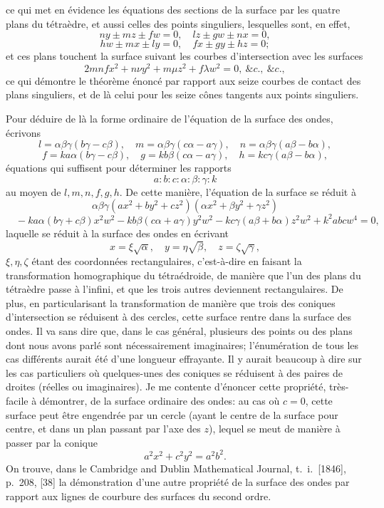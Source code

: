 \documentclass[12pt,a4paper]{article}
\begin{document}
ce qui met en \'evidence les \'equations des sections de la surface par les quatre plans du t\'etra\`edre, et aussi celles des points singuliers, lesquelles sont, en effet,
\[
ny \pm mz \pm fw = 0,\quad lz \pm gw \pm nx = 0,
\]
\[
hw \pm mx \pm ly = 0,\quad fx \pm gy \pm hz = 0;
\]
et ces plans touchent la surface suivant les courbes d'intersection avec les surfaces
\[
2mnfx^2 + n\nu y^2 + m\mu z^2 + f\lambda w^2 = 0,\ \&c.,\ \&c.,
\]
ce qui d\'emontre le th\'eor\`eme \'enonc\'e par rapport aux seize courbes de contact des plans singuliers, et de l\`a celui pour les seize c\^ones tangents aux points singuliers.

Pour d\'eduire de l\`a la forme ordinaire de l'\'equation de la surface des ondes, \'ecrivons
\[
l = \alpha\beta\gamma(b\gamma - c\beta),\quad m = \alpha\beta\gamma(c\alpha - a\gamma),\quad n = \alpha\beta\gamma(a\beta - b\alpha),
\]
\[
f = ka\alpha(b\gamma - c\beta),\quad g = kb\beta(c\alpha - a\gamma),\quad h = kc\gamma(a\beta - b\alpha),
\]
\'equations qui suffisent pour d\'eterminer les rapports
\[
a : b : c : \alpha : \beta : \gamma : k
\]
au moyen de $l, m, n, f, g, h$. De cette mani\`ere, l'\'equation de la surface se r\'eduit \`a
\[
\alpha\beta\gamma(ax^2 + by^2 + cz^2)(\alpha x^2 + \beta y^2 + \gamma z^2)
\]
\[
\quad - ka\alpha(b\gamma + c\beta)x^2 w^2 - kb\beta(c\alpha + a\gamma)y^2 w^2 - kc\gamma(a\beta + b\alpha)z^2 w^2 + k^2 abc w^4 = 0,
\]
laquelle se r\'eduit \`a la surface des ondes en \'ecrivant
\[
x = \xi\sqrt{\alpha},\quad y = \eta\sqrt{\beta},\quad z = \zeta\sqrt{\gamma},
\]
$\xi, \eta, \zeta$ \'etant des coordonn\'ees rectangulaires, c'est-\`a-dire en faisant la transformation homographique du t\'etra\'edroide, de mani\`ere que l'un des plans du t\'etra\`edre passe \`a l'infini, et que les trois autres deviennent rectangulaires. De plus, en particularisant la transformation de mani\`ere que trois des coniques d'intersection se r\'eduisent \`a des cercles, cette surface rentre dans la surface des ondes. Il va sans dire que, dans le cas g\'en\'eral, plusieurs des points ou des plans dont nous avons parl\'e sont n\'ecessairement imaginaires; l'\'enum\'eration de tous les cas diff\'erents aurait \'et\'e d'une longueur effrayante. Il y aurait beaucoup \`a dire sur les cas particuliers o\`u quelques-unes des coniques se r\'eduisent \`a des paires de droites (r\'eelles ou imaginaires). Je me contente d'\'enoncer cette propri\'et\'e, tr\`es-facile \`a d\'emontrer, de la surface ordinaire des ondes: au cas o\`u $c = 0$, cette surface peut \^etre engendr\'ee par un cercle (ayant le centre de la surface pour centre, et dans un plan passant par l'axe des $z$), lequel se meut de mani\`ere \`a passer par la conique
\[
a^2 x^2 + c^2 y^2 = a^2 b^2.
\]
On trouve, dans le Cambridge and Dublin Mathematical Journal, t.~i.~[1846], p.~208, [38] la d\'emonstration d'une autre propri\'et\'e de la surface des ondes par rapport aux lignes de courbure des surfaces du second ordre.
\end{document}
